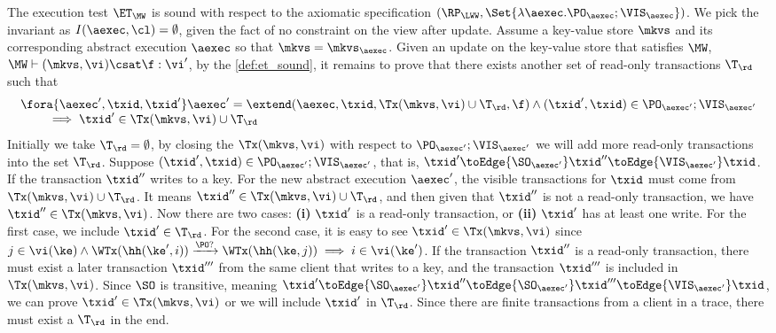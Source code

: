 The execution test $\ET_\MW$ is sound with respect to the axiomatic specification 
$(\RP_{\LWW}, \Set{\lambda \aexec. \PO_{\aexec} ; \VIS_{\aexec} })$.
We pick the invariant as \( I( \aexec, \cl ) = \emptyset \), given the fact of no constraint on the view after update.
Assume a key-value store \( \mkvs \) and its corresponding abstract execution \( \aexec \) so that \( \mkvs = \mkvs_\aexec \).
Given an update on the key-value store that satisfies \( \MW \), \ie \( \MW \vdash (\mkvs, \vi) \csat \f : \vi' \),
by the \cref{def:et_sound}, it remains to prove that there exists another set of read-only transactions \( \T_{\rd} \) such that
\[
    \begin{array}{@{}l@{}}
        \fora{ \aexec', \txid, \txid' } \aexec' = \extend(\aexec, \txid, \Tx(\mkvs, \vi) \cup \T_\rd, \f ) \land (\txid' ,\txid)  \in \PO_{\aexec'} ; \VIS_{\aexec'}  \\
        \qquad {} \implies \txid' \in \Tx(\mkvs, \vi) \cup \T_\rd
    \end{array}
\]
Initially we take \( \T_\rd = \emptyset \), 
by closing the \( \Tx(\mkvs, \vi) \) with respect to \( \PO_{\aexec'} ; \VIS_{\aexec'} \)
we will add more read-only transactions into the set \( \T_\rd\).
Suppose \( (\txid' ,\txid)  \in \PO_{\aexec'} ; \VIS_{\aexec'} \), 
that is, \( \txid' \toEdge{\SO_{\aexec'}} \txid'' \toEdge{\VIS_{\aexec'}} \txid \).
If the transaction \( \txid'' \) writes to a key.
For the new abstract execution \( \aexec' \), the visible transactions for \( \txid \) must come from \( \Tx(\mkvs, \vi) \cup \T_\rd \).
It means \( \txid'' \in \Tx(\mkvs, \vi) \cup \T_\rd  \),
and then given that \( \txid'' \) is not a read-only transaction, we have \( \txid'' \in \Tx(\mkvs, \vi) \).
Now there are two cases: \textbf{(i)} \( \txid' \) is a read-only transaction, or \textbf{(ii)} \( \txid' \) has at least one write.
For the first case, we include \( \txid' \in \T_{\rd} \).
For the second case, it is easy to see \( \txid' \in \Tx(\mkvs, \vi) \) since \( j \in \vi(\ke) \wedge \WTx(\hh(\ke', i)) \xrightarrow{\PO?} \WTx(\hh(\ke, j)) \implies i \in \vi(\ke') \).
If the transaction \( \txid'' \) is a read-only transaction, 
there must exist a later transaction \( \txid''' \) from the same client that writes to a key,
and the transaction \( \txid''' \) is included in \( \Tx(\mkvs, \vi) \).
Since \( \SO \) is transitive, 
meaning \( \txid' \toEdge{\SO_{\aexec'}} \txid'' \toEdge{\SO_{\aexec'}} \txid''' \toEdge{\VIS_{\aexec'}} \txid \), 
we can prove \( \txid' \in \Tx(\mkvs, \vi) \) or we will include \( \txid' \) in \( \T_\rd \).
Since there are finite transactions from a client in a trace, there must exist a \( \T_\rd \) in the end.


